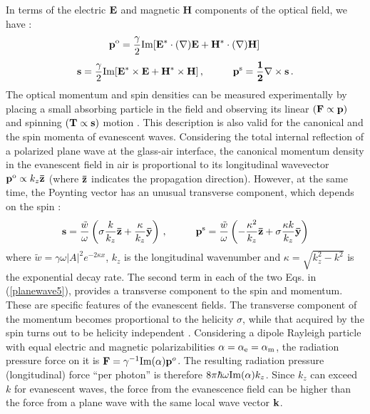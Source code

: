 \documentclass[journal=apchd5,manuscript=article]{achemso}
\begin{document}
In terms of the electric ${\bf E}$ and magnetic {\bf H} components of the optical field, we have \cite{Bliokh2014}:
\begin{equation}\label{planewave3}
{\bf p}^{\rm o} = \frac{\gamma}{2} {\rm Im}[\bf E^\ast \cdot (\bf \nabla) \bf E+ \bf H^\ast \cdot (\bf \nabla) \bf H]\,
\end{equation}
\begin{equation}\label{planewave4}
{\bf s}= \frac{\gamma}{2} {\rm Im} [\bf E^\ast \times \bf E + \bf H^\ast \times \bf H]\, , \hspace{1 cm}
{\bf p}^{\rm s}= \frac{1}{2} \bf \nabla \times \bf s \, .
\end{equation}
The optical momentum and spin densities can be measured experimentally by placing a small absorbing particle in the field and observing its linear $(\bf F \propto \bf p)$ and spinning $(\bf T \propto \bf s)$ motion \cite{Bliokh2014,adachi2007orbital,Antognozzi2016,rodriguez2015lateral}. This description is also valid for the canonical and the spin momenta of evanescent waves. Considering the total internal reflection of a polarized plane wave at the glass-air interface, the canonical momentum density in the evanescent field in air is proportional to its longitudinal wavevector ${\bf p}^{\rm o} \propto k_z \bf \bar{z}$ (where $\bf \bar{z}$ indicates the propagation direction). However, at the same time, the Poynting vector has an unusual transverse component, which depends on the spin \cite{Bliokh2014}:
\begin{equation} \label{planewave5}
{\bf s} = \frac{\tilde w}{\omega}\left(\sigma  \frac{k}{k_z} {\bf \bar{z}} + \frac{\kappa}{k_z} {\bf \bar{y}}\right)\, , \hspace{1 cm}
{\bf p}^{\rm s} = \frac{\tilde w}{\omega}\left(- \frac{\kappa^2}{k_z} {\bf \bar{z}} + \sigma \frac{\kappa k}{k_z} {\bf \bar{y}}\right)
\end{equation}
where $\tilde {w}=\gamma \omega |A|^2 e^{-2\kappa x}$, $k_z$ is the longitudinal wavenumber and $\kappa = \sqrt{k_z^2 - k^2}$ is the exponential decay rate. The second term in each of the two Eqs. in (\ref{planewave5}), provides a transverse component to the spin and momentum. These are specific features of the evanescent fields. The transverse component of the momentum becomes proportional to the helicity $\sigma$, while that acquired by the spin turns out to be helicity independent \cite{Bliokh2014}. Considering a dipole Rayleigh particle with equal electric and magnetic polarizabilities $\alpha = \alpha_{\rm e} = \alpha_{\rm m}$, the radiation pressure force on it is \cite{Bliokh2014} ${\bf F} = \gamma^{-1} {\rm Im}(\alpha) {\bf p}^o$. The resulting radiation pressure (longitudinal) force ``per photon'' is therefore $8 \pi \hbar \omega {\rm Im}(\alpha) k_z$. Since $k_z$ can exceed $k$ for evanescent waves, the force from the evanescence field can be higher than the force from a plane wave with the same local wave vector ${\bf k}$.
\end{document}

